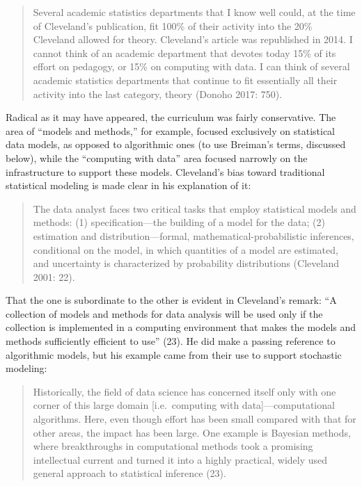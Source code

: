\documentclass[
  letterpaper,
]{report}
\begin{document}
\begin{quote}
Several academic statistics departments that I know well could, at the
time of Cleveland's publication, fit 100\% of their activity into the
20\% Cleveland allowed for theory. Cleveland's article was republished
in 2014. I cannot think of an academic department that devotes today
15\% of its effort on pedagogy, or 15\% on computing with data. I can
think of several academic statistics departments that continue to fit
essentially all their activity into the last category, theory (Donoho
2017: 750).
\end{quote}

Radical as it may have appeared, the curriculum was fairly conservative.
The area of ``models and methods,'' for example, focused exclusively on
statistical data models, as opposed to algorithmic ones (to use
Breiman's terms, discussed below), while the ``computing with data''
area focused narrowly on the infrastructure to support these models.
Cleveland's bias toward traditional statistical modeling is made clear
in his explanation of it:

\begin{quote}
The data analyst faces two critical tasks that employ statistical models
and methods: (1) specification---the building of a model for the data;
(2) estimation and distribution---formal, mathematical-probabilistic
inferences, conditional on the model, in which quantities of a model are
estimated, and uncertainty is characterized by probability distributions
(Cleveland 2001: 22).
\end{quote}

That the one is subordinate to the other is evident in Cleveland's
remark: ``A collection of models and methods for data analysis will be
used only if the collection is implemented in a computing environment
that makes the models and methods sufficiently efficient to use'' (23).
He did make a passing reference to algorithmic models, but his example
came from their use to support stochastic modeling:

\begin{quote}
Historically, the field of data science has concerned itself only with
one corner of this large domain {[}i.e.~computing with
data{]}---computational algorithms. Here, even though effort has been
small compared with that for other areas, the impact has been large. One
example is Bayesian methods, where breakthroughs in computational
methods took a promising intellectual current and turned it into a
highly practical, widely used general approach to statistical inference
(23).
\end{quote}
\end{document}
